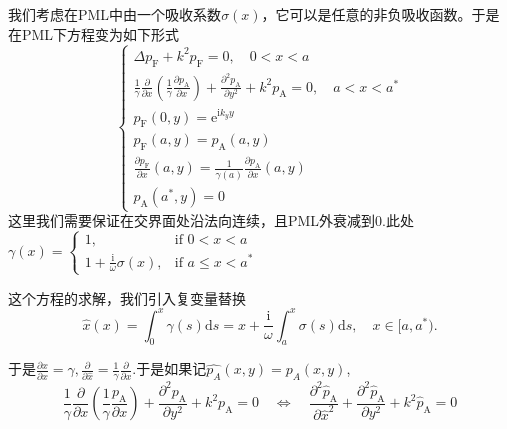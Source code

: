 \documentclass{article}
\begin{document}
\begin{CJK*}{UTF8}{gbsn}
我们考虑在PML中由一个吸收系数$\sigma
(x)$，它可以是任意的非负吸收函数。于是在PML下方程变为如下形式
\[ \left\{ \begin{array}{l}
     \Delta p_{\mathrm{F}} + k^2 p_{\mathrm{F}} = 0, \quad 0 < x < a\\
     \frac{1}{\gamma}  \frac{\partial}{\partial x}  \left( \frac{1}{\gamma} 
     \frac{\partial p_{\mathrm{A}}}{\partial x} \right) + \frac{\partial^2
     p_{\mathrm{A}}}{\partial y^2} + k^2 p_{\mathrm{A}} = 0, \quad a < x <
     a^{\ast}\\
     p_{\mathrm{F}} (0, y) = \mathrm{e}^{\mathrm{i} k_y y}\\
     p_{\mathrm{F}} (a, y) = p_{\mathrm{A}} (a, y)\\
     \frac{\partial p_{\mathrm{F}}}{\partial x} (a, y) = \frac{1}{\gamma (a)} 
     \frac{\partial p_{\mathrm{A}}}{\partial x} (a, y)\\
     p_{\mathrm{A}} (a^{\ast}, y) = 0
   \end{array} \right. \]
这里我们需要保证在交界面处沿法向连续，且PML外衰减到0.此处$\gamma
(x) = \left\{ \begin{array}{ll}
  1, & \text{if } 0 < x < a\\
  1 + \frac{\mathrm{i}}{\omega} \sigma (x), & \text{if } a \leqslant x <
  a^{\ast}
\end{array} \right.$

这个方程的求解，我们引入复变量替换
\[ \hat{x} (x) = \int_0^x \gamma (s) \mathrm{d} s = x +
   \frac{\mathrm{i}}{\omega}  \int_a^x \sigma (s) \mathrm{d} s, \quad x \in
   [a, a^{\ast}) . \]


于是$\frac{\partial \hat{x}}{\partial x} = \gamma, \frac{\partial}{\partial
\hat{x}} = \frac{1}{\gamma} \frac{\partial}{\partial
x}$.于是如果记$\widehat{p_A} (x, y) = p_A (x, y)$,
\[ \frac{1}{\gamma}  \frac{\partial}{\partial x}  \left( \frac{1}{\gamma} 
   \frac{p_{\mathrm{A}}}{\partial x} \right) + \frac{\partial^2
   p_{\mathrm{A}}}{\partial y^2} + k^2 p_{\mathrm{A}} = 0 \quad
   \Longleftrightarrow \quad \frac{\partial^2  \hat{p}_{\mathrm{A}}}{\partial
   \hat{x}^2} + \frac{\partial^2  \hat{p}_{\mathrm{A}}}{\partial y^2} + k^2 
   \hat{p}_{\mathrm{A}} = 0 \]



\end{CJK*}
\end{document}
